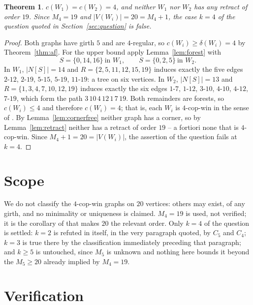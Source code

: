 \documentclass[11pt]{amsart}
\newtheorem{theorem}{Theorem}[section]
\theoremstyle{remark}
\newcommand{\cn}{c}
\begin{document}
\begin{theorem}\label{thm:main}
$\cn(W_1)=\cn(W_2)=4$, and neither $W_1$ nor $W_2$ has any retract of order $19$. Since
$M_4=19$ and $|V(W_i)|=20=M_4+1$, the case $k=4$ of the question quoted in
Section~\ref{sec:question} is false.
\end{theorem}

\begin{proof}
Both graphs have girth $5$ and are $4$-regular, so $\cn(W_i)\ge\delta(W_i)=4$ by
Theorem~\ref{thm:af}. For the upper bound apply Lemma~\ref{lem:forest} with
\[
  S=\{0,14,16\}\ \text{in } W_1,
  \qquad
  S=\{0,2,5\}\ \text{in } W_2 .
\]
In $W_1$, $|N[S]|=14$ and $R=\{2,5,11,12,15,19\}$ induces exactly the five edges
$2\text{-}12$, $2\text{-}19$, $5\text{-}15$, $5\text{-}19$, $11\text{-}19$: a tree on six
vertices. In $W_2$, $|N[S]|=13$ and $R=\{1,3,4,7,10,12,19\}$ induces exactly the six edges
$1\text{-}7$, $1\text{-}12$, $3\text{-}10$, $4\text{-}10$, $4\text{-}12$, $7\text{-}19$,
which form the path $3\,10\,4\,12\,1\,7\,19$. Both remainders are forests, so
$\cn(W_i)\le4$ and therefore $\cn(W_i)=4$; that is, each $W_i$ is $4$-cop-win in the sense of
\cite{TY}. By Lemma~\ref{lem:cornerfree} neither graph has a corner, so by
Lemma~\ref{lem:retract} neither has a retract of order $19$ -- a fortiori none that is
$4$-cop-win. Since $M_4+1=20=|V(W_i)|$, the assertion of the question fails at $k=4$.
\end{proof}

\section{Scope}\label{sec:scope}

We do not classify the $4$-cop-win graphs on $20$ vertices: others may exist, of any girth,
and no minimality or uniqueness is claimed. $M_4=19$ is used, not verified; it is the corollary
of \cite{TY} that makes $20$ the relevant order. Only $k=4$ of the question is settled: $k=2$
is refuted in \cite{TY} itself, in the very paragraph quoted, by $C_5$ and $C_4$; $k=3$ is true
there by the classification immediately preceding that paragraph; and $k\ge5$ is untouched,
since $M_5$ is unknown and nothing here bounds it beyond the $M_5\ge20$ already implied by
$M_4=19$.

\section{Verification}\label{sec:verif}
\end{document}
